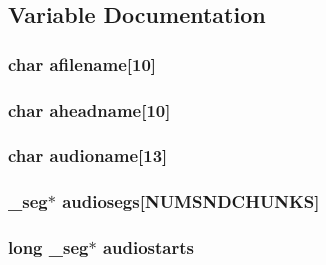 \subsection{Variable Documentation}
\hypertarget{ID__CA_8H_ac7fd0efffc3b41d475ede3556547646a}{
\subsubsection[{afilename}]{\setlength{\rightskip}{0pt plus 5cm}char {\bf afilename}\mbox{[}10\mbox{]}}}
\label{ID__CA_8H_ac7fd0efffc3b41d475ede3556547646a}
\hypertarget{ID__CA_8H_ae27bc3abca3350509677eede2aa0f32a}{
\subsubsection[{aheadname}]{\setlength{\rightskip}{0pt plus 5cm}char {\bf aheadname}\mbox{[}10\mbox{]}}}
\label{ID__CA_8H_ae27bc3abca3350509677eede2aa0f32a}
\hypertarget{ID__CA_8H_aedfaf0a69707063299a02a1af291edc1}{
\subsubsection[{audioname}]{\setlength{\rightskip}{0pt plus 5cm}char {\bf audioname}\mbox{[}13\mbox{]}}}
\label{ID__CA_8H_aedfaf0a69707063299a02a1af291edc1}
\hypertarget{ID__CA_8H_a6a31b9ada480b861c1ed6f0276bda609}{
\subsubsection[{audiosegs}]{ \_\-seg$\ast$ {\bf audiosegs}\mbox{[}NUMSNDCHUNKS\mbox{]}}}
\label{ID__CA_8H_a6a31b9ada480b861c1ed6f0276bda609}
\hypertarget{ID__CA_8H_aca24eee9c13114cc6f73c094c7eb9379}{
\subsubsection[{audiostarts}]{\setlength{\rightskip}{0pt plus 5cm}long \_\-seg$\ast$ {\bf audiostarts}}}
\label{ID__CA_8H_aca24eee9c13114cc6f73c094c7eb9379}
